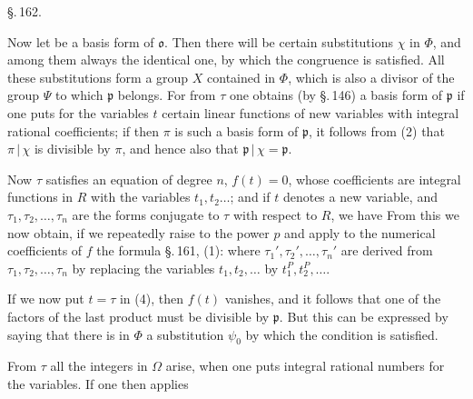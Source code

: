 \begin{center}
\S.\,162.\\[4pt]
\end{center}

Now let
be a basis form of $\mathfrak{o}$. Then there will be certain substitutions $\chi$ in $\Phi$, and among them always the identical one, by which the congruence
is satisfied. All these substitutions form a group $X$ contained in $\Phi$, which is also a divisor of the group $\Psi$ to which $\mathfrak{p}$ belongs. For from $\tau$ one obtains (by \S.\,146) a basis form of $\mathfrak{p}$ if one puts for the variables $t$ certain linear functions of new variables with integral rational coefficients; if then $\pi$ is such a basis form of $\mathfrak{p}$, it follows from (2) that $\pi \,|\, \chi$ is divisible by $\pi$, and hence also that $\mathfrak{p} \,|\, \chi = \mathfrak{p}$.

Now $\tau$ satisfies an equation of degree $n$, $f(t) = 0$, whose coefficients are integral functions in $R$ with the variables $t_1, t_2 \ldots$; and if $t$ denotes a new variable, and $\tau_1, \tau_2, \ldots, \tau_n$ are the forms conjugate to $\tau$ with respect to $R$, we have
From this we now obtain, if we repeatedly raise to the power $p$ and apply to the numerical coefficients of $f$ the formula \S.\,161, (1):
where $\tau_1', \tau_2', \ldots, \tau_n'$ are derived from $\tau_1, \tau_2, \ldots, \tau_n$ by replacing the variables $t_1, t_2, \ldots$ by $t_1^P, t_2^P, \ldots$.

If we now put $t = \tau$ in (4), then $f(t)$ vanishes, and it follows that one of the factors of the last product must be divisible by $\mathfrak{p}$. But this can be expressed by saying that there is in $\Phi$ a substitution $\psi_0$ by which the condition
is satisfied.

From $\tau$ all the integers in $\Omega$ arise, when one puts integral rational numbers for the variables. If one then applies
